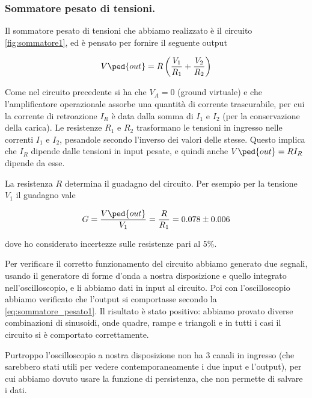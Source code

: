 \subsubsection{Sommatore pesato di tensioni.}

Il sommatore pesato di tensioni che abbiamo realizzato è il circuito \ref{fig:sommatore1},
ed è pensato per fornire il seguente output

\begin{equation}
    V\ped{out} = R\left(\frac{V_1}{R_1} + \frac{V_2}{R_2}\right)
    \label{eq:sommatore_pesato1}
\end{equation}

Come nel circuito precedente si ha che $V_A = 0$ (ground virtuale) e che
l'amplificatore operazionale assorbe una quantità di corrente trascurabile,
per cui la corrente di retroazione $I_R$ è data dalla somma di $I_1$ e $I_2$
(per la conservazione della carica).
Le resistenze $R_1$ e $R_2$ trasformano le tensioni in ingresso nelle correnti
$I_1$ e $I_2$, pesandole secondo l'inverso dei valori delle stesse.
Questo implica che $I_R$ dipende dalle tensioni in input pesate,
e quindi anche $V\ped{out} = RI_R$ dipende da esse.

La resistenza $R$ determina il guadagno del circuito. Per esempio per la tensione
$V_1$ il guadagno vale

\begin{equation}
    G = \frac{V\ped{out}}{V_1} = \frac{R}{R_1} = 0.078 \pm 0.006
\end{equation}

dove ho considerato incertezze sulle resistenze pari al 5\%.

Per verificare il corretto funzionamento del circuito abbiamo generato due segnali,
usando il generatore di forme d'onda a nostra disposizione e quello integrato
nell'oscilloscopio, e li abbiamo dati in input al circuito. Poi con l'oscilloscopio
abbiamo verificato che l'output si comportasse secondo la \eqref{eq:sommatore_pesato1}.
Il risultato è stato positivo: abbiamo provato diverse combinazioni di sinusoidi,
onde quadre, rampe e triangoli e in tutti i casi il circuito si è comportato correttamente.

Purtroppo l'oscilloscopio a nostra disposizione non ha 3 canali in ingresso (che sarebbero
stati utili per vedere contemporaneamente i due input e l'output), per cui abbiamo dovuto
usare la funzione di persistenza, che non permette di salvare i dati.
